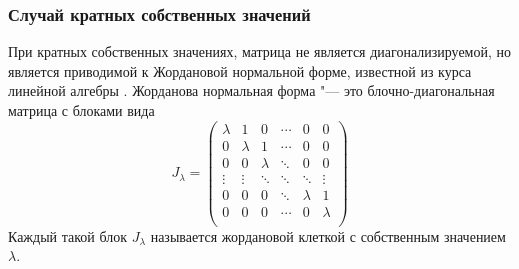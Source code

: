 \subsubsection{Случай кратных собственных значений}
При кратных собственных значениях, матрица не является диагонализируемой, но является 
приводимой к Жордановой нормальной форме, известной из курса линейной алгебры
\cite{costrikin_va2}. Жорданова нормальная форма "--- это блочно-диагональная матрица с 
блоками вида 
$$
J_\lambda=
\begin{pmatrix}
	\lambda & 1       & 0             & \cdots & 0       & 0      \\
	0           & \lambda & 1             & \cdots & 0       & 0      \\
	0           & 0       & \lambda       & \ddots & 0       & 0      \\
	\vdots   & \vdots  & \ddots     & \ddots & \ddots  & \vdots \\
	0           & 0       & 0             & \ddots & \lambda & 1      \\
	0           & 0       & 0             & \cdots & 0       & \lambda \\
\end{pmatrix}
$$
Каждый такой блок $J_{\lambda}$ называется жордановой клеткой с собственным значением $
\lambda$. 

